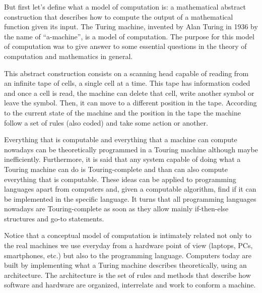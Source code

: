 But first let's define what a model of computation is: a mathematical abstract construction 
that describes how to compute the output of a mathematical function given its input.
The Turing machine, invented by Alan Turing in 1936 by the name of ``a-machine'', is a model of computation. 
The purpose for this model of computation was to give answer to some essential questions 
in the theory of computation and mathematics in general. 

This abstract construction consists on a scanning head capable of reading from an 
infinite tape of cells, a single cell at a time. 
This tape has information coded and once a cell is read, the machine can delete that cell, 
write another symbol or leave the symbol. 
Then, it can move to a different position in the tape. 
According to the current state of the 
machine and the position in the tape the machine follow a set of rules (also coded) and take some action or another. 

Everything that is computable and everything that a machine can compute nowadays can be theoretically programmed in a Touring machine 
although maybe inefficiently. 
Furthermore, it is said that any system capable of doing what a Touring machine can do is Touring-complete and 
than can also compute everything that is computable. 
These ideas can be applied to programming languages apart from computers and,
given a computable algorithm, find if it can be implemented in the specific language.
It turns that all programming languages nowadays are Touring-complete as soon as they allow 
mainly if-then-else structures and go-to statements. 

Notice that a conceptual model of computation is intimately related not only to the 
real machines we use everyday from a hardware point of view (laptops, PCs, smartphones, etc.) 
but also to the programming language. 
Computers today are built by implementing what 
a Turing machine describes theoretically, using an architecture. 
The architecture is the set of rules and methods that describe how software 
and hardware are organized, interrelate and work to conform a machine.

